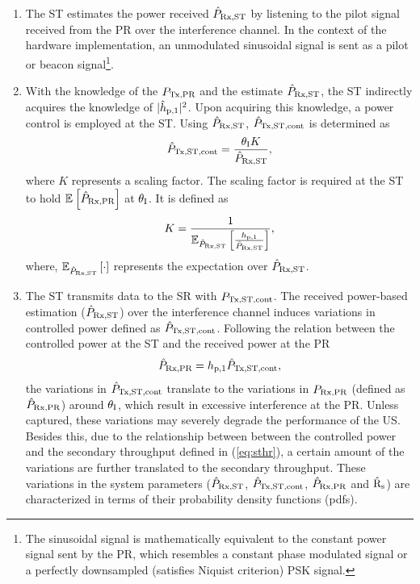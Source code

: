 \begin{enumerate}
	\item The ST estimates the power received $\hat{P}_{\text{Rx,ST}}$ by listening to the pilot signal received from the PR over the interference channel. In the context of the hardware implementation, an unmodulated sinusoidal signal is sent as a pilot or beacon signal\footnote{The sinusoidal signal is mathematically equivalent to the constant power signal sent by the PR, which resembles a constant phase modulated signal or a perfectly downsampled (satisfies Niquist criterion) PSK signal.}.
	\item With the knowledge of the $P_{\text{Tx,PR}}$ and the estimate $\hat{P}_{\text{Rx,ST}}$, the ST indirectly acquires the knowledge of $|\hat{h}_{\text{p,1}}|^2$. 
	Upon acquiring this knowledge, a power control is employed at the ST. Using $\hat{P}_{\text{Rx,ST}}$, $\hat{P}_{\text{Tx,ST,cont}}$ is determined as 
\begin{align}
\hat{P}_{\text{Tx,ST,cont}} = \frac{\theta_{\text{I}} K}{\hat{P}_{\text{Rx,ST}}}, \label{eq:preg} 
\end{align}
where $K$ represents a scaling factor. The scaling factor is required at the ST to hold ${\mathbb E}_{}\left[ \hat{P}_{\text{Rx,PR}} \right]$ at $\theta_{\text{I}}$. It is defined as
\begin{align}
K = \frac{1}{ \e{\eprcvd}{\frac{\gpo}{\eprcvd}}},%
\end{align}
where, ${\mathbb E}_{\hat{P}_{\text{Rx,ST}}}\left[ \cdot \right]$ represents the expectation over $\hat{P}_{\text{Rx,ST}}$.
	\item The ST transmits data to the SR with $P_{\text{Tx,ST,cont}}$. 
	The received power-based estimation ($\hat{P}_{\text{Rx,ST}}$) over the interference channel induces variations in controlled power defined as $\hat{P}_{\text{Tx,ST,cont}}$. Following the relation between the controlled power at the ST and the received power at the PR 
\begin{align}
\hat{P}_{\text{Rx,PR}}  = h_{\text{p,1}} \hat{P}_{\text{Tx,ST,cont}},
\label{eq:eprcvdpr}
\end{align}
the variations in $\hat{P}_{\text{Tx,ST,cont}}$ translate to the variations in $P_{\text{Rx,PR}}$ (defined as $\hat{P}_{\text{Rx,PR}}$) around $\theta_{\text{I}}$, which result in excessive interference at the PR. Unless captured, these variations may severely degrade the performance of the US. Besides this, due to the relationship between between the controlled power and the secondary throughput defined in (\ref{eq:sthr}), a certain amount of the variations are further translated to the secondary throughput. These variations in the system parameters ($\hat{P}_{\text{Rx,ST}}$, $\hat{P}_{\text{Tx,ST,cont}}$, $\hat{P}_{\text{Rx,PR}}$ and $\hat{\text{{R}}}_{\text{s}}$) are characterized in terms of their probability density functions (pdfs).  

\end{enumerate}
